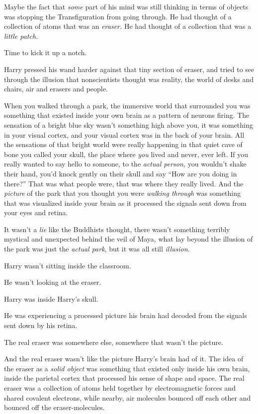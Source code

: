 Maybe the fact that \emph{some} part of his mind was still thinking in terms of objects was stopping the Transfiguration from going through. He had thought of a collection of atoms that was an \emph{eraser.} He had thought of a collection that was a \emph{little patch.}

Time to kick it up a notch.

Harry pressed his wand harder against that tiny section of eraser, and tried to see through the illusion that nonscientists thought was reality, the world of desks and chairs, air and erasers and people.

When you walked through a park, the immersive world that surrounded you was something that existed inside your own brain as a pattern of neurons firing. The sensation of a bright blue sky wasn't something high above you, it was something in your visual cortex, and your visual cortex was in the back of your brain. All the sensations of that bright world were really happening in that quiet cave of bone you called your skull, the place where \emph{you} lived and never, ever left. If you really wanted to say hello to someone, to the \emph{actual person,} you wouldn't shake their hand, you'd knock gently on their skull and say ``How are you doing in there?'' That was what people were, that was where they really lived. And the \emph{picture} of the park that you thought you were \emph{walking through} was something that was visualized inside your brain as it processed the signals sent down from your eyes and retina.

It wasn't a \emph{lie} like the Buddhists thought, there wasn't something terribly mystical and unexpected behind the veil of Maya, what lay beyond the illusion of the park was just the \emph{actual park}, but it was all still \emph{illusion}.

Harry wasn't sitting inside the classroom.

He wasn't looking at the eraser.

Harry was inside Harry's skull.

He was experiencing a processed picture his brain had decoded from the signals sent down by his retina.

The real eraser was somewhere else, somewhere that wasn't the picture.

And the real eraser wasn't like the picture Harry's brain had of it. The idea of the eraser as a \emph{solid object} was something that existed only inside his own brain, inside the parietal cortex that processed his sense of shape and space. The real eraser was a collection of atoms held together by electromagnetic forces and shared covalent electrons, while nearby, air molecules bounced off each other and bounced off the eraser-molecules.

